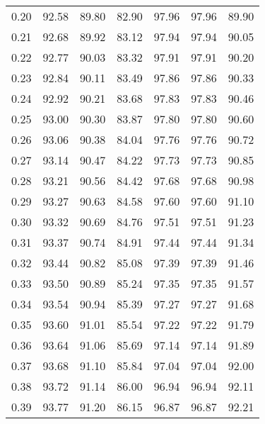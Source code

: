 \begin{tabular}{|c|c|c|c|c|c|c|}
      0.20 &     92.58 &     89.80 &      82.90 &   97.96 &      97.96 &         89.90 \\
      0.21 &     92.68 &     89.92 &      83.12 &   97.94 &      97.94 &         90.05 \\
      0.22 &     92.77 &     90.03 &      83.32 &   97.91 &      97.91 &         90.20 \\
      0.23 &     92.84 &     90.11 &      83.49 &   97.86 &      97.86 &         90.33 \\
      0.24 &     92.92 &     90.21 &      83.68 &   97.83 &      97.83 &         90.46 \\
      0.25 &     93.00 &     90.30 &      83.87 &   97.80 &      97.80 &         90.60 \\
      0.26 &     93.06 &     90.38 &      84.04 &   97.76 &      97.76 &         90.72 \\
      0.27 &     93.14 &     90.47 &      84.22 &   97.73 &      97.73 &         90.85 \\
      0.28 &     93.21 &     90.56 &      84.42 &   97.68 &      97.68 &         90.98 \\
      0.29 &     93.27 &     90.63 &      84.58 &   97.60 &      97.60 &         91.10 \\
      0.30 &     93.32 &     90.69 &      84.76 &   97.51 &      97.51 &         91.23 \\
      0.31 &     93.37 &     90.74 &      84.91 &   97.44 &      97.44 &         91.34 \\
      0.32 &     93.44 &     90.82 &      85.08 &   97.39 &      97.39 &         91.46 \\
      0.33 &     93.50 &     90.89 &      85.24 &   97.35 &      97.35 &         91.57 \\
      0.34 &     93.54 &     90.94 &      85.39 &   97.27 &      97.27 &         91.68 \\
      0.35 &     93.60 &     91.01 &      85.54 &   97.22 &      97.22 &         91.79 \\
      0.36 &     93.64 &     91.06 &      85.69 &   97.14 &      97.14 &         91.89 \\
      0.37 &     93.68 &     91.10 &      85.84 &   97.04 &      97.04 &         92.00 \\
      0.38 &     93.72 &     91.14 &      86.00 &   96.94 &      96.94 &         92.11 \\
      0.39 &     93.77 &     91.20 &      86.15 &   96.87 &      96.87 &         92.21 \\

\end{tabular}
